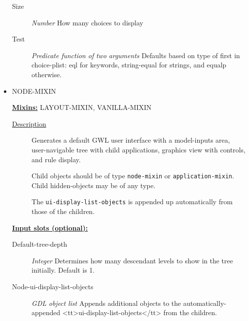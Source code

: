 \documentclass [11pt]{book}
\begin{document}
\begin{itemize}
\begin{description}
\item [Size]
\emph{Number} How many choices to display


\item [Test]
\emph{Predicate function of two arguments} Defaults based on type of first in choice-plist:
eql for keywords, string-equal for strings, and equalp otherwise.


\end{description}







\item {}NODE-MIXIN


\textbf{
\underline{Mixins:}} LAYOUT-MIXIN, VANILLA-MIXIN





\begin{description}

\item [
\underline{Description}]


Generates a default GWL user interface with a model-inputs area,
user-navigable tree with child applications, graphics view with controls, and rule display. 

Child objects should be of type \texttt{node-mixin} or \texttt{application-mixin}. Child hidden-objects
may be of any type.

The \texttt{ui-display-list-objects} is appended up automatically from those of the children.



\end{description}








\textbf{
\underline{Input slots (optional):}}

\begin{description}

\item [Default-tree-depth]
\emph{Integer} Determines how many descendant levels to show in the tree initially. Default is 1.


\item [Node-ui-display-list-objects]
\emph{GDL object list} Appends additional objects to the automatically-appended <tt>ui-display-list-objects</tt>
from the children.



\end{description}
\end{itemize}
\end{document}
